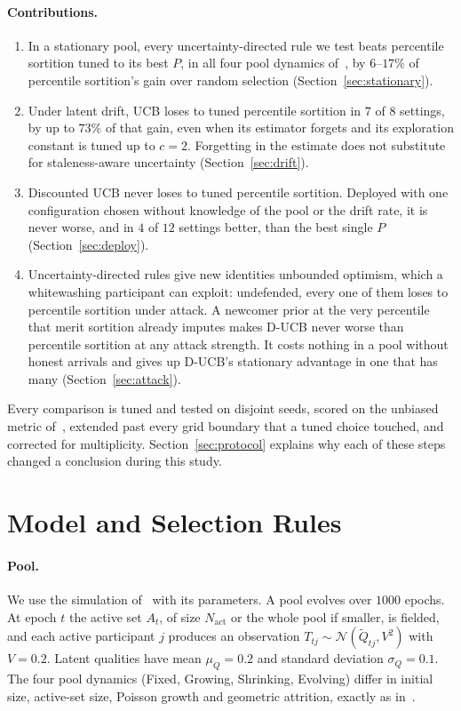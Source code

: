 \documentclass[sigconf,anonymous,review,nonacm]{acmart}
\begin{document}
\paragraph{Contributions.}
\begin{enumerate}
\item In a stationary pool, every uncertainty-directed rule we test beats percentile
sortition tuned to its best $P$, in all four pool dynamics of~\cite{kruijssen2024}, by
$6$--$17\%$ of percentile sortition's gain over random selection
(Section~\ref{sec:stationary}).
\item Under latent drift, UCB loses to tuned percentile sortition in $7$ of $8$
settings, by up to $73\%$ of that gain, even when its estimator forgets and its
exploration constant is tuned up to $c=2$. Forgetting in the estimate does not
substitute for staleness-aware uncertainty (Section~\ref{sec:drift}).
\item Discounted UCB never loses to tuned percentile sortition. Deployed with one
configuration chosen without knowledge of the pool or the drift rate, it is
never worse, and in $4$ of $12$ settings better, than the best single $P$
(Section~\ref{sec:deploy}).
\item Uncertainty-directed rules give new identities unbounded optimism, which a
whitewashing participant can exploit: undefended, every one of them loses to percentile
sortition under attack. A newcomer prior at the very percentile that merit sortition already
imputes makes D-UCB never worse than percentile sortition at any attack strength. It costs
nothing in a pool without honest arrivals and gives up D-UCB's stationary advantage in one
that has many (Section~\ref{sec:attack}).
\end{enumerate}
Every comparison is tuned and tested on disjoint seeds, scored on the unbiased metric
of~\cite{companionA}, extended past every grid boundary that a tuned choice touched, and
corrected for multiplicity. Section~\ref{sec:protocol} explains why each of these steps
changed a conclusion during this study.

\section{Model and Selection Rules}
\label{sec:model}

\paragraph{Pool.} We use the simulation of~\cite{kruijssen2024} with its parameters. A pool
evolves over $1000$ epochs. At epoch $t$ the active set $A_t$, of size $N_{\mathrm{act}}$ or
the whole pool if smaller, is fielded, and each active participant $j$ produces an
observation $T_{tj}\sim\mathcal N(\tilde Q_{tj},V^2)$ with $V=0.2$. Latent qualities have
mean $\mu_Q=0.2$ and standard deviation $\sigma_Q=0.1$. The four pool dynamics (Fixed,
Growing, Shrinking, Evolving) differ in initial size, active-set size, Poisson growth and
geometric attrition, exactly as in~\cite{kruijssen2024,companionA}.
\end{document}
